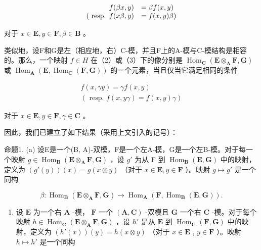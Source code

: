 \[
\begin{array}{r l} f (\beta x, y) & = \beta f (x, y) \\ (\text { resp.   } f (x \beta , y) & = f (x, y) \beta) \end{array}
\]

对于 \(x \in \mathbf{E}, y \in \mathbf{F}, \beta \in \mathbf{B}\) 。

类似地，设F和G是左（相应地，右）C-模，并且F上的A-模与C-模结构是相容的。那么，一个映射 \(f \in H\) 在（2）或（3）下的像分别是 \(\operatorname{Hom}_{\mathbf{C}}(\mathbf{E} \otimes_{\mathbf{A}} \mathbf{F}, \mathbf{G})\) 或 \(\operatorname{Hom}_{\mathbf{A}}(\mathbf{E}, \operatorname{Hom}_{\mathbf{C}}(\mathbf{F}, \mathbf{G}))\) 的一个元素，当且仅当它满足相同的条件

\[
\begin{array}{c} f (x, \gamma y) = \gamma f (x, y) \\ (\text { resp. } f (x, y \gamma) = f (x, y) \gamma) \end{array}
\]

对于 \(x \in \mathbf{E}, y \in \mathbf{F}, \gamma \in \mathbf{C}\) 。

因此，我们已建立了如下结果（采用上文引入的记号）：

命题1. (a) 设E是一个(B, A)-双模，F是一个左A-模，G是一个左B-模。对于每一个映射 \(g \in \operatorname{Hom}_{\mathbf{B}}(\mathbf{E} \otimes_{\mathbf{A}} \mathbf{F}, \mathbf{G})\) ，设 \(g'\) 为从 F 到 \(\operatorname{Hom}_{\mathbf{B}}(\mathbf{E}, \mathbf{G})\) 中的映射，定义为 \((g'(y))(x) = g(x \otimes y)\) （对于 \(x \in \mathbf{E}, y \in \mathbf{F}\) ）。映射 \(g \mapsto g'\) 是一个同构

\[
\beta : \operatorname{Hom} _ {\mathbf {B}} (\mathbf {E} \otimes_ {\mathbf {A}} \mathbf {F}, \mathbf {G}) \rightarrow \operatorname{Hom} _ {\mathbf {A}} (\mathbf {F}, \operatorname{Hom} _ {\mathbf {B}} (\mathbf {E}, \mathbf {G})).\tag{5}
\]

\begin{enumerate}
\def\labelenumi{(\alph{enumi})}
\setcounter{enumi}{1}
\tightlist
\item
  设 \(\mathbf{E}\) 为一个右 \(\mathbf{A}\) -模， \(\mathbf{F}\) 一个 \((\mathbf{A}, \mathbf{C})\) -双模且 \(\mathbf{G}\) 一个右 \(\mathbf{C}\) -模。对于每个映射 \(h \in \operatorname{Hom}_{\mathbf{C}}(\mathbf{E} \otimes_{\mathbf{A}} \mathbf{F}, \mathbf{G})\) ，设 \(h'\) 是从 \(\mathbf{E}\) 到 \(\operatorname{Hom}_{\mathbf{C}}(\mathbf{F}, \mathbf{G})\) 中的映射，定义为 \((h'(x))(y) = h(x \otimes y)\) （对于 \(x \in \mathbf{E}\) , \(y \in \mathbf{F}\) ）。映射 \(h \mapsto h'\) 是一个同构
\end{enumerate}

